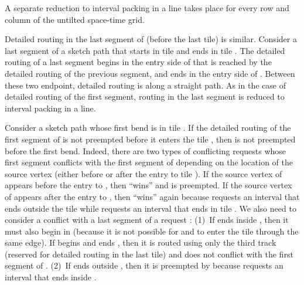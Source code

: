 \documentclass[11pt]{article}
\newenvironment{proof sketch}[1]{\noindent {\emph{Proof sketch of #1:}}}{\hfill \qed}
\begin{document}
A separate reduction to interval packing in a line takes place for every row and column of the
untilted space-time grid.

Detailed routing in the last segment of  (before the last tile) is similar.
Consider a last segment of a sketch path  that starts in tile  and
ends in tile .  The detailed routing of a last segment
begins in the entry side of  that is reached by the detailed routing of
the previous segment, and ends in the entry side of . Between these two
endpoint, detailed routing is along a straight path. As in the case of detailed
routing of the first segment, routing in the last segment is reduced to interval
packing in a line.

Consider a sketch path  whose first bend is in tile .  If the detailed
routing of the first segment of  is not preempted before it enters the tile ,
then  is not preempted before the first bend. Indeed, there are two types of
conflicting requests whose first segment conflicts with the first segment of 
depending on the location of the source vertex (either before or after the entry to
tile ). If the source vertex of  appears before the entry to , then 
``wins'' and  is preempted. If the source vertex of  appears after the entry
to , then  ``wins'' again because  requests an interval that ends
outside the tile  while  requests an interval that ends in tile . We also
need to consider a conflict with a last segment of a request : (1)~If  ends
inside , then it must also begin in  (because it is not possible for  and
 to enter the tile through the same edge). If  begins and ends , then it
is routed using only the third track (reserved for detailed routing in the last tile)
and  does not conflict with the first segment of . (2)~If  ends outside
, then it is preempted by  because  requests an interval that ends
inside .
\end{document}
